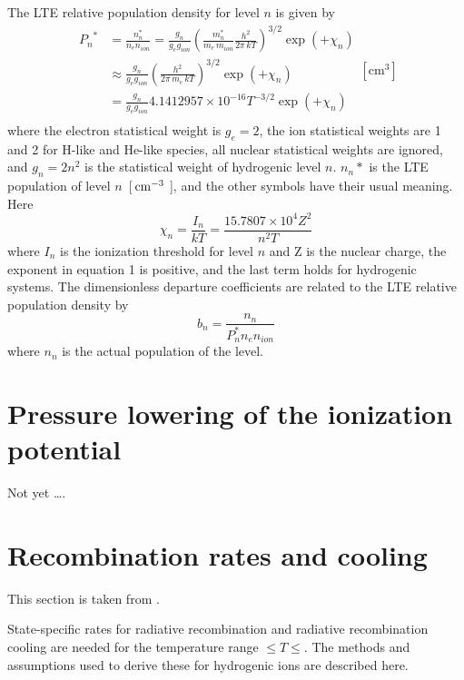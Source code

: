 The LTE relative population density for level $n$ is given by
\begin{equation}
\begin{array}{cl}
 {P_n}^*& = \frac{{n_n^*}}{{{n_e}{n_{ion}}}} =
\frac{{{g_n}}}{{{g_e}{g_{ion}}}}{\left(
{\frac{{m_n^*}}{{{m_e}\,{m_{ion}}}}\frac{{{h^2}}}{{2\pi \,kT}}}
\right)^{3/2}}\exp \left( { + {\chi _n}} \right) \\
&  \approx \frac{{{g_n}}}{{{g_e}{g_{ion}}}}{\left( {\frac{{{h^2}}}{{2\pi
\,{m_e}\,kT}}} \right)^{3/2}}\exp \left( { + {\chi _n}} \right) \\
&  = \frac{{{g_n}}}{{{g_e}{g_{ion}}}}4.1412957 \times {10^{ - 16}}{T^{ -
3/2}}\exp \left( { + {\chi _n}} \right) \\
 \end{array}
\mathrm{[cm^3]}
\end{equation}
where the electron statistical weight is $g_e = 2$, the ion statistical weights
are 1 and 2 for H-like and He-like species,
all nuclear statistical weights are ignored,
and $g_n = 2n^2$ is the statistical weight of hydrogenic level $n$.
$n_n*$ is the LTE population of level $n$~[${\rm\thinspace cm^{-3}}$ ],
and the other symbols have their usual meaning.
Here
\begin{equation}
{\chi _n} = \frac{{{I_n}}}{{kT}} = \frac{{15.7807 \times
{{10}^4}{Z^2}}}{{{n^2}T}}
\end{equation}
where $I_n$ is the ionization threshold for level $n$
and Z is the nuclear charge,
the exponent in equation 1 is positive,
and the last term holds for hydrogenic systems.
The dimensionless departure coefficients are related to the LTE
relative population density by
\begin{equation}
b_n = \frac{n_n}{P_n^* n_e n_{ion}}
\end{equation}
where $n_n$ is the actual population of the level.

\section{Pressure lowering of the ionization potential}

Not yet \dots.%

\section{Recombination rates and cooling}

This section is taken from \citet{Ferland1989}.

State-specific rates for radiative recombination and radiative
recombination cooling are needed for the temperature range
\TempLimitLow$ \le T \le $\TempLimitHigh.
The methods and assumptions used to derive these for hydrogenic ions
are described here.

